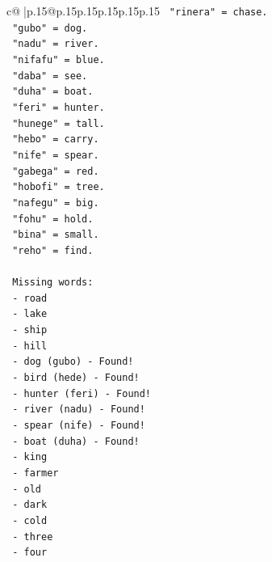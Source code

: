 \documentclass{article}
\begin{document}
{\begin{supertabular}{c@{$\;$}|p{.15\linewidth}@{}p{.15\linewidth}p{.15\linewidth}p{.15\linewidth}p{.15\linewidth}p{.15\linewidth}}
{{{\texttt{        "rinera" = chase.} \\
\texttt{        "gubo" = dog.} \\
\texttt{        "nadu" = river.} \\
\texttt{        "nifafu" = blue.} \\
\texttt{        "daba" = see.} \\
\texttt{        "duha" = boat.} \\
\texttt{        "feri" = hunter.} \\
\texttt{        "hunege" = tall.} \\
\texttt{        "hebo" = carry.} \\
\texttt{        "nife" = spear.} \\
\texttt{        "gabega" = red.} \\
\texttt{        "hobofi" = tree.} \\
\texttt{        "nafegu" = big.} \\
\texttt{        "fohu" = hold.} \\
\texttt{        "bina" = small.} \\
\texttt{        "reho" = find.} \\
\\ 
\texttt{        Missing words:} \\
\texttt{        {-} road} \\
\texttt{        {-} lake} \\
\texttt{        {-} ship} \\
\texttt{        {-} hill} \\
\texttt{        {-} dog (gubo) {-} Found!} \\
\texttt{        {-} bird (hede) {-} Found!} \\
\texttt{        {-} hunter (feri) {-} Found!} \\
\texttt{        {-} river (nadu) {-} Found!} \\
\texttt{        {-} spear (nife) {-} Found!} \\
\texttt{        {-} boat (duha) {-} Found!} \\
\texttt{        {-} king} \\
\texttt{        {-} farmer} \\
\texttt{        {-} old} \\
\texttt{        {-} dark} \\
\texttt{        {-} cold} \\
\texttt{        {-} three} \\
\texttt{        {-} four} \\
}}}
\end{supertabular}}
\end{document}
